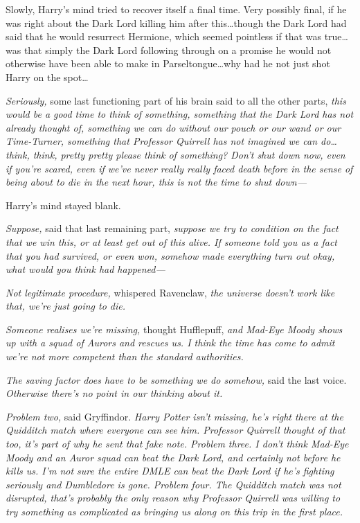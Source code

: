Slowly, Harry’s mind tried to recover itself a final time. Very possibly final, if he was right about the Dark Lord killing him after this…though the Dark Lord had said that he would resurrect Hermione, which seemed pointless if that was true…was that simply the Dark Lord following through on a promise he would not otherwise have been able to make in Parseltongue…why had he not just shot Harry on the spot…

\emph{Seriously,} some last functioning part of his brain said to all the other parts, \emph{this would be a good time to think of something, something that the Dark Lord has not already thought of, something we can do without our pouch or our wand or our Time-Turner, something that Professor Quirrell has not imagined we can do…think, think, pretty pretty please think of something? Don’t shut down now, even if you’re scared, even if we’ve never really really faced death before in the sense of being about to die in the next hour, \emph{this is not the time to shut down—}}

Harry’s mind stayed blank.

\emph{Suppose,} said that last remaining part, \emph{suppose we try to condition on the fact that we win this, or at least get out of this alive. If someone \emph{told you as a fact} that you had survived, or even won, somehow made everything turn out okay, what would you think had happened—}

\emph{Not legitimate procedure,} whispered Ravenclaw, \emph{the universe doesn’t work like that, we’re just going to die.}

\emph{Someone realises we’re missing,} thought Hufflepuff, \emph{and Mad-Eye Moody shows up with a squad of Aurors and rescues us. I think the time has come to admit we’re not more competent than the standard authorities.}

\emph{The saving factor does have to be something we \emph{do} somehow,} said the last voice. \emph{Otherwise there’s no point in our thinking about it.}

\emph{Problem two,} said Gryffindor. \emph{Harry Potter isn’t missing, he’s right there at the Quidditch match where everyone can see him. Professor Quirrell thought of that too, it’s part of why he sent that fake note. Problem three. I don’t think Mad-Eye Moody and an Auror squad can beat the Dark Lord, and certainly not before he kills us. I’m not sure the entire DMLE can beat the Dark Lord if he’s fighting seriously and Dumbledore is gone. Problem four. The Quidditch match was not disrupted, that’s probably the only reason why Professor Quirrell was willing to try something as complicated as bringing us along on this trip in the first place.}

